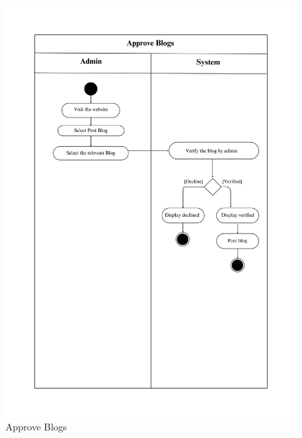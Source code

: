 \begin{figure}[h]
    \centering
    \includegraphics[width=1\textwidth]{Images/Activity Diagrams/8 Approve Blogs.png}
    \caption{Approve Blogs}
    \label{fig:activity-approve-blog}
\end{figure}

